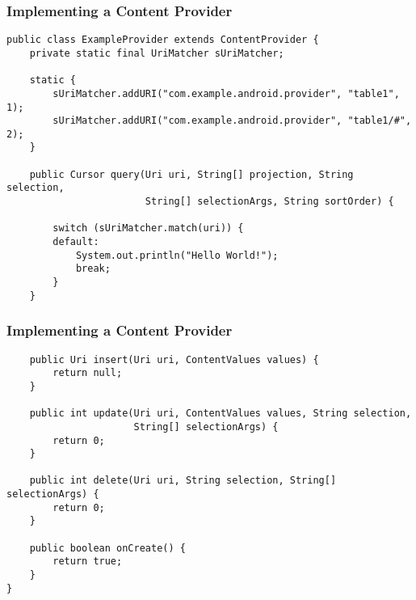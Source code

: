 \begin{frame}[fragile]
  \frametitle{Implementing a Content Provider}
\begin{verbatim}
public class ExampleProvider extends ContentProvider {
    private static final UriMatcher sUriMatcher;
    
    static {
        sUriMatcher.addURI("com.example.android.provider", "table1", 1);
        sUriMatcher.addURI("com.example.android.provider", "table1/#", 2);
    }
    
    public Cursor query(Uri uri, String[] projection, String selection,
                        String[] selectionArgs, String sortOrder) {
        
        switch (sUriMatcher.match(uri)) {
        default:
            System.out.println("Hello World!");
            break;
        }
    }
\end{verbatim}
\end{frame}

\begin{frame}[fragile]
  \frametitle{Implementing a Content Provider}
\begin{verbatim}
    public Uri insert(Uri uri, ContentValues values) {
        return null;
    }
    
    public int update(Uri uri, ContentValues values, String selection,
                      String[] selectionArgs) {
        return 0;
    }
    
    public int delete(Uri uri, String selection, String[] selectionArgs) {
        return 0;
    }   

    public boolean onCreate() {
        return true;
    }
}
\end{verbatim}
\end{frame}
